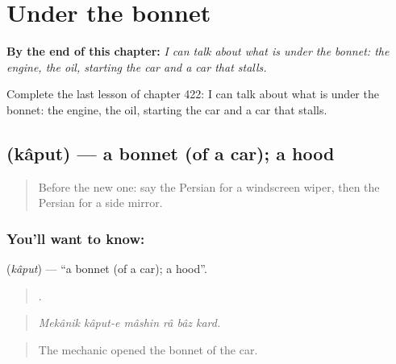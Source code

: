 
\chapter{Under the bonnet}
\label{ch:fa-under-the-bonnet}

\begin{chapteropening}
\textbf{By the end of this chapter:} \emph{I can talk about what is under the bonnet: the engine, the oil, starting the car and a car that stalls.}

Complete the last lesson of chapter 422: I can talk about what is under the bonnet: the engine, the oil, starting the car and a car that stalls.
\end{chapteropening}

\section[\texorpdfstring{\fa{کاپوت} (kâput)}{کاپوت (kâput)}]{ (kâput) — a bonnet (of a car); a hood}

\label{lesson:FA-C422-kaput}



\begin{quote}
Before the new one: say the Persian for a windscreen wiper, then the Persian for a side mirror.
\end{quote}

\subsection*{You'll want to know: }
\textbf{} (\emph{kâput}) — \textquotedblleft{}a bonnet (of a car); a hood\textquotedblright{}.

\begin{quote}
     .
\end{quote}

\begin{quote}
\emph{Mekânik kâput-e mâshin râ bâz kard.}
\end{quote}

\begin{quote}
The mechanic opened the bonnet of the car.
\end{quote}


